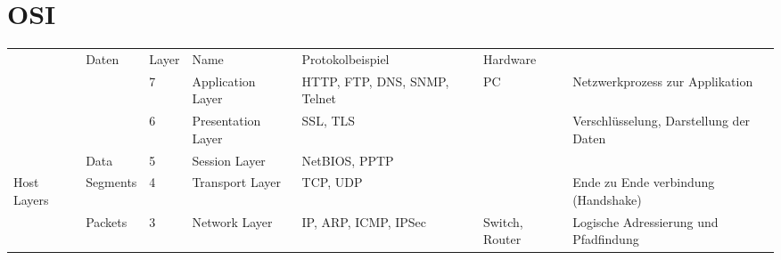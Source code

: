 \documentclass[
]{article}
\author{}
\date{}
\begin{document}
\hypertarget{osi}{%
\section{OSI}\label{osi}}

\begin{table}[]
\begin{tabular}{lllllll}
                               & Daten                                          & Layer                     & Name                                       & Protokolbeispiel                                                    & Hardware                               &                                                                \\
                               & \cellcolor[HTML]{9AFF99}                       & \cellcolor[HTML]{9AFF99}7 & \cellcolor[HTML]{9AFF99}Application Layer  & \cellcolor[HTML]{9AFF99}HTTP, FTP, DNS, SNMP, Telnet                & \cellcolor[HTML]{9AFF99}PC             & \cellcolor[HTML]{9AFF99}Netzwerkprozess zur Applikation        \\
                               & \cellcolor[HTML]{9AFF99}                       & \cellcolor[HTML]{9AFF99}6 & \cellcolor[HTML]{9AFF99}Presentation Layer & \cellcolor[HTML]{9AFF99}SSL, TLS                                    & \cellcolor[HTML]{9AFF99}               & \cellcolor[HTML]{9AFF99}Verschlüsselung, Darstellung der Daten \\
                               & \multirow{-3}{*}{\cellcolor[HTML]{9AFF99}Data} & \cellcolor[HTML]{9AFF99}5 & \cellcolor[HTML]{9AFF99}Session Layer      & \cellcolor[HTML]{9AFF99}NetBIOS, PPTP                               & \cellcolor[HTML]{9AFF99}               & \cellcolor[HTML]{9AFF99}                                       \\
\multirow{-4}{*}{Host Layers}  & \cellcolor[HTML]{67FD9A}Segments               & \cellcolor[HTML]{67FD9A}4 & \cellcolor[HTML]{67FD9A}Transport Layer    & \cellcolor[HTML]{67FD9A}TCP, UDP                                    & \cellcolor[HTML]{67FD9A}               & \cellcolor[HTML]{67FD9A}Ende zu Ende verbindung (Handshake)    \\
                               & \cellcolor[HTML]{FFFC9E}Packets                & \cellcolor[HTML]{FFFC9E}3 & \cellcolor[HTML]{FFFC9E}Network Layer      & \cellcolor[HTML]{FFFC9E}IP, ARP, ICMP, IPSec                        & \cellcolor[HTML]{FFFC9E}Switch, Router & \cellcolor[HTML]{FFFC9E}Logische Adressierung und Pfadfindung  \\

\end{tabular}
\end{table}
\end{document}
